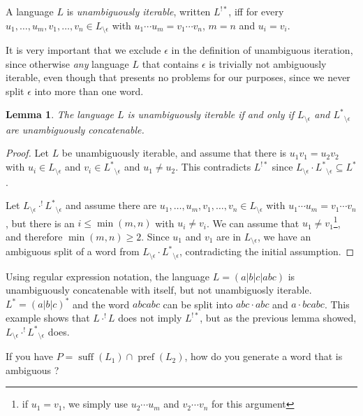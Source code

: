 \documentclass{amsart}
\newcommand{\ensmath}[1]{\ensuremath{#1}\xspace}
\newcommand{\suff}{\ensmath{\operatorname{suff}}}
\newcommand{\pref}{\ensmath{\operatorname{pref}}}
\newcommand{\uaconc}[2]{\ensmath{#1\cdot^{!} #2}}
\newcommand{\cstar}[1]{\ensmath{#1^*}}
\newcommand{\uastar}[1]{\ensmath{#1^{!*}}}
\newcommand{\noeps}[1]{\ensmath{{#1}_{\setminus \epsilon}}}
\newtheorem{lemma}[theorem]{Lemma}
{\theoremstyle{definition}
  \newtheorem{defn}{Definition}
  \newtheorem*{remark}{Remark}
  \newtheorem*{example}{Example}}
\begin{document}
\begin{defn}
A language $L$ is \emph{unambiguously iterable}, written \uastar{L}, iff
for every $u_1,\dots,u_m, v_1,\dots,v_n \in \noeps{L}$ with $u_1\cdots u_m
= v_1 \cdots v_n$, $m=n$ and $u_i = v_i$.
\end{defn}

It is very important that we exclude $\epsilon$ in the definition of
unambiguous iteration, since otherwise \emph{any} language $L$ that
contains $\epsilon$ is trivially not ambiguously iterable, even though that
presents no problems for our purposes, since we never split $\epsilon$ into
more than one word.

\begin{lemma}
The language $L$ is unambiguously iterable if and only if $\noeps{L}$ and
$\noeps{\cstar{L}}$ are unambiguously concatenable.
\end{lemma}
\begin{proof}
Let $L$ be unambiguously iterable, and assume that there is $u_1v_1 =
u_2v_2$ with $u_i \in \noeps{L}$ and $v_i \in \noeps{\cstar{L}}$ and $u_1
\neq u_2$. This contradicts $\uastar{L}$ since $\noeps{L}\cdot
\noeps{\cstar{L}}\subseteq \cstar{L}$.

Let $\uaconc{\noeps{L}}{\noeps{\cstar{L}}}$ and assume there are
$u_1,\dots,u_m, v_1,\dots,v_n \in \noeps{L}$ with $u_1\cdots u_m = v_1
\cdots v_n$, but there is an $i \leq \min(m,n)$ with $u_i \neq v_i$. We can
assume that $u_1 \neq v_1$\footnote{if $u_1 = v_1$, we simply use
  $u_2\cdots u_m$ and $v_2 \cdots v_n$ for this argument}, and therefore
$\min(m,n)\geq 2$. Since $u_1$ and $v_1$ are in $\noeps{L}$, we have an
ambiguous split of a word from $\noeps{L}\cdot\noeps{\cstar{L}}$,
contradicting the initial assumption.
\end{proof}

\begin{example}
Using regular expression notation, the language $L=(a|b|c|abc)$ is
unambiguously concatenable with itself, but not unambiguosly
iterable. $\cstar{L} = (a|b|c)^*$ and the word $abcabc$ can be split into
$abc\cdot abc$ and $a\cdot bcabc$. This example shows that $\uaconc{L}{L}$
does not imply $\uastar{L}$, but as the previous lemma showed,
$\uaconc{\noeps{L}}{\noeps{\cstar{L}}}$ does.
\end{example}

If you have $P = \suff(L_1) \cap \pref(L_2)$, how do you generate a word that
is ambiguous ?
\end{document}
